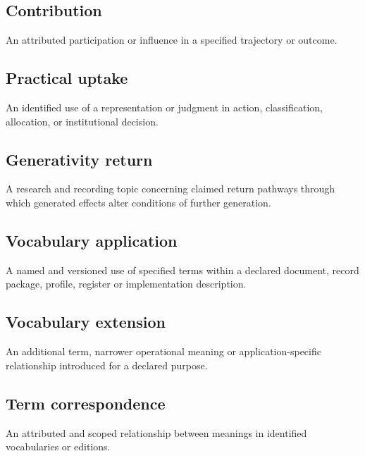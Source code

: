 \documentclass[11pt,a4paper]{article}
\begin{document}
\subsection{Contribution}
An attributed participation or influence in a specified trajectory or outcome.

\subsection{Practical uptake}
An identified use of a representation or judgment in action, classification, allocation, or institutional decision.

\subsection{Generativity return}
A research and recording topic concerning claimed return pathways through which generated effects alter conditions of further generation.

\subsection{Vocabulary application}
A named and versioned use of specified terms within a declared document, record package, profile, register or implementation description.

\subsection{Vocabulary extension}
An additional term, narrower operational meaning or application-specific relationship introduced for a declared purpose.

\subsection{Term correspondence}
An attributed and scoped relationship between meanings in identified vocabularies or editions.
\end{document}
